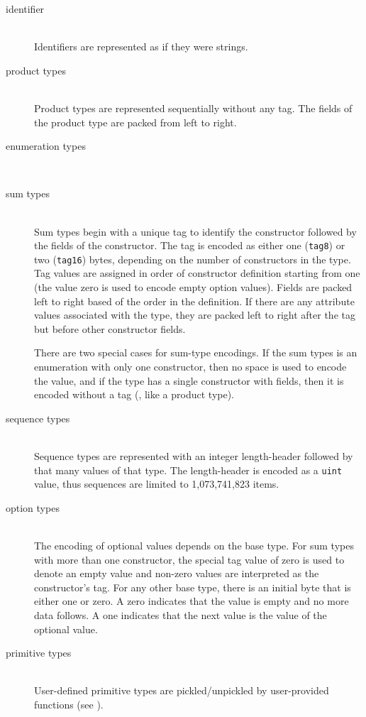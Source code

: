 \begin{description}
  \item[identifier] \mbox{}\\
    Identifiers are represented as if they were strings. 

  \item[product types] \mbox{}\\ 
    Product types are represented sequentially without any tag.
    The fields of the product type are packed from left to right.

  \item[enumeration types] \mbox{}\\

  \item[sum types] \mbox{}\\
    Sum types begin with a unique tag to identify the constructor
    followed by the fields of the constructor.
    The tag is encoded as either one (\lstinline!tag8!) or two (\lstinline!tag16!)
    bytes, depending on the number of constructors in the type.
    Tag values are assigned in order of constructor definition starting from one (the
    value zero is used to encode empty option values).
    Fields are packed left to right based of the order in the definition.
    If there are any attribute values associated with the type, they are packed left to right
    after the tag but before other constructor fields.
    
    There are two special cases for sum-type encodings.
    If the sum types is an enumeration with only one constructor, then no space is used to
    encode the value, and if the type has a single constructor with fields, then it is
    encoded without a tag (\ie{}, like a product type).

  \item[sequence types] \mbox{}\\
    Sequence types are represented with an integer length-header followed by
    that many values of that type.
    The length-header is encoded as a \lstinline!uint! value, thus sequences are limited
    to 1,073,741,823 items.

  \item[option types] \mbox{}\\
    The encoding of optional values depends on the base type.
    For sum types with more than one constructor, the special tag value of zero is
    used to denote an empty value and non-zero values are interpreted as
    the constructor's tag.
    For any other base type, there is an initial byte that is either one or zero.
    A zero indicates that the value is empty and no more data follows.
    A one indicates that the next value is the value of the optional value.

  \item[primitive types] \mbox{}\\
    User-defined primitive types are pickled/unpickled by user-provided functions (see
    ).
\end{description}%

